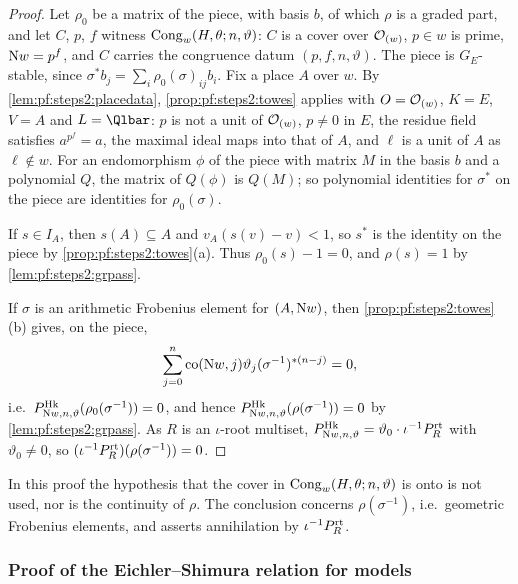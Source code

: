 \begin{proof}
Let $\rho_0$ be a matrix of the piece, with basis $b$, of which $\rho$ is a graded part, and let $C$,
$p$, $f$ witness $\mathrm{Cong}_w(H,\theta;n,\vartheta)$: $C$ is a cover over $\mathcal{O}_{(w)}$, $p\in w$ is
prime, $\mathrm{N}w=p^f$, and $C$ carries the congruence datum $(p,f,n,\vartheta)$. The piece is
$G_E$-stable, since $\sigma^\ast b_j=\sum_i\rho_0(\sigma)_{ij}b_i$. Fix a place $A$ over $w$. By
\cref{lem:pf:steps2:placedata}, \cref{prop:pf:steps2:towes} applies with $O=\mathcal{O}_{(w)}$, $K=E$, $V=A$
and $L=\Qlbar$: $p$ is not a unit of $\mathcal{O}_{(w)}$, $p\ne0$ in $E$, the residue field satisfies
$a^{p^f}=a$, the maximal ideal maps into that of $A$, and $\ell$ is a unit of $A$ as $\ell\notin w$.
For an endomorphism $\phi$ of the piece with matrix $M$ in the basis $b$ and a polynomial $Q$, the
matrix of $Q(\phi)$ is $Q(M)$; so polynomial identities for $\sigma^\ast$ on the piece are identities
for $\rho_0(\sigma)$.

If $s\in I_A$, then $s(A)\subseteq A$ and $v_A(s(v)-v)<1$, so $s^\ast$ is the identity on the piece by
\cref{prop:pf:steps2:towes}(a). Thus $\rho_0(s)-1=0$, and $\rho(s)=1$ by \cref{lem:pf:steps2:grpass}.

If $\sigma$ is an arithmetic Frobenius element for $(A,\mathrm{N}w)$, then
\cref{prop:pf:steps2:towes}(b) gives, on the piece,
\[
  \sum_{j=0}^n\mathrm{co}(\mathrm{N}w,j)\vartheta_j(\sigma^{-1})^{\ast(n-j)}=0,
\]
i.e.\ $P^{\mathrm{Hk}}_{\mathrm{N}w,n,\vartheta}(\rho_0(\sigma^{-1}))=0$, and hence
$P^{\mathrm{Hk}}_{\mathrm{N}w,n,\vartheta}(\rho(\sigma^{-1}))=0$ by \cref{lem:pf:steps2:grpass}. As $R$ is
an $\iota$-root multiset, $P^{\mathrm{Hk}}_{\mathrm{N}w,n,\vartheta}=\vartheta_0\cdot\iota^{-1}P^{\mathrm{rt}}_R$
with $\vartheta_0\ne0$, so $(\iota^{-1}P^{\mathrm{rt}}_R)(\rho(\sigma^{-1}))=0$.
\end{proof}

\begin{remark}\label{rem:pf:steps2:esunused}
In this proof the hypothesis that the cover in $\mathrm{Cong}_w(H,\theta;n,\vartheta)$ is onto is not
used, nor is the continuity of $\rho$. The conclusion concerns $\rho(\sigma^{-1})$, i.e.\ geometric
Frobenius elements, and asserts annihilation by $\iota^{-1}P^{\mathrm{rt}}_R$.
\end{remark}


\subsubsection{Proof of the Eichler--Shimura relation for models}\label{sec:pf:steps2:esgen}

